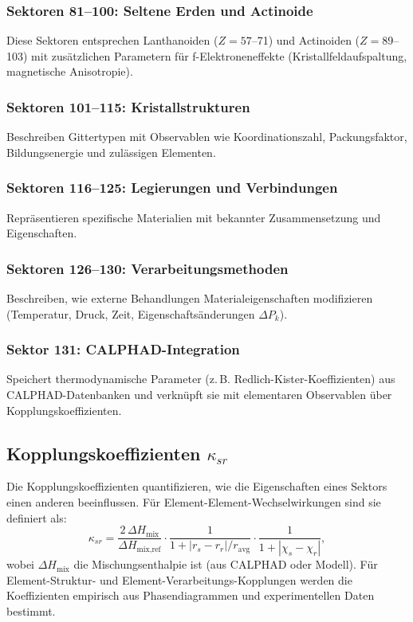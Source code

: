 \documentclass[12pt,a4paper]{article}
\begin{document}
\subsubsection{Sektoren 81–100: Seltene Erden und Actinoide}
Diese Sektoren entsprechen Lanthanoiden (\(Z=57\)–71) und Actinoiden (\(Z=89\)–103) mit zusätzlichen Parametern für f-Elektroneneffekte (Kristallfeldaufspaltung, magnetische Anisotropie).

\subsubsection{Sektoren 101–115: Kristallstrukturen}
Beschreiben Gittertypen mit Observablen wie Koordinationszahl, Packungsfaktor, Bildungsenergie und zulässigen Elementen.

\subsubsection{Sektoren 116–125: Legierungen und Verbindungen}
Repräsentieren spezifische Materialien mit bekannter Zusammensetzung und Eigenschaften.

\subsubsection{Sektoren 126–130: Verarbeitungsmethoden}
Beschreiben, wie externe Behandlungen Materialeigenschaften modifizieren (Temperatur, Druck, Zeit, Eigenschaftsänderungen \(\Delta P_k\)).

\subsubsection{Sektor 131: CALPHAD-Integration}
Speichert thermodynamische Parameter (z. B. Redlich-Kister-Koeffizienten) aus CALPHAD-Datenbanken und verknüpft sie mit elementaren Observablen über Kopplungskoeffizienten.

\subsection{Kopplungskoeffizienten \(\kappa_{sr}\)}

Die Kopplungskoeffizienten quantifizieren, wie die Eigenschaften eines Sektors einen anderen beeinflussen. Für Element-Element-Wechselwirkungen sind sie definiert als:
\[
\kappa_{sr} = \frac{2\,\Delta H_{\text{mix}}}{\Delta H_{\text{mix,ref}}} \cdot
\frac{1}{1 + |r_s - r_r|/r_{\text{avg}}} \cdot
\frac{1}{1 + |\chi_s - \chi_r|},
\]
wobei \(\Delta H_{\text{mix}}\) die Mischungsenthalpie ist (aus CALPHAD oder Modell). Für Element-Struktur- und Element-Verarbeitungs-Kopplungen werden die Koeffizienten empirisch aus Phasendiagrammen und experimentellen Daten bestimmt.
\end{document}

